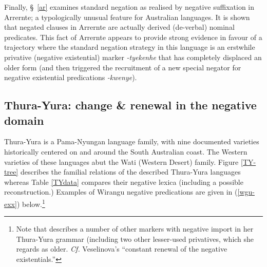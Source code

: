Finally, §~\ref{ar} examines standard negation as realised by negative suffixation in Arrernte; a typologically unusual feature for Australian languages. It is shown that negated clauses in Arrernte are actually derived (de-verbal) nominal predicates. This fact of Arrernte appears to provide strong evidence in favour of a trajectory where the standard negation strategy in this language is an erstwhile privative (negative existential) marker \textit{-tye\textdblhyphen kenhe} that has completely displaced an older form (and then triggered the recruitment of a new special negator for negative existential predications \textit{-kwenye}).




\subsection{Thura-Yura: change \& renewal in the negative domain}\label{TY}

Thura-Yura is a Pama-Nyungan language family, with nine documented varieties historically centered on and around the South Australian coast. The Western varieties of these languages abut the Wati (Western Desert) family. Figure \ref{TY-tree} describes the familial relations of the described Thura-Yura languages whereas Table \ref{TYdata} compares their negative lexica (including a possible reconstruction.) Examples of Wirangu negative predications are given in (\ref{wgu-exx}) below.\footnote{Note that \citep[57]{Hercus1999} describes a number of other markers with negative import in her Thura-Yura grammar (including two other lesser-used privatives, which she regards as older. \textit{Cf.} Veselinova's \citeyearpar[173]{Veselinova2016} ``constant renewal of the negative existentials.''}



